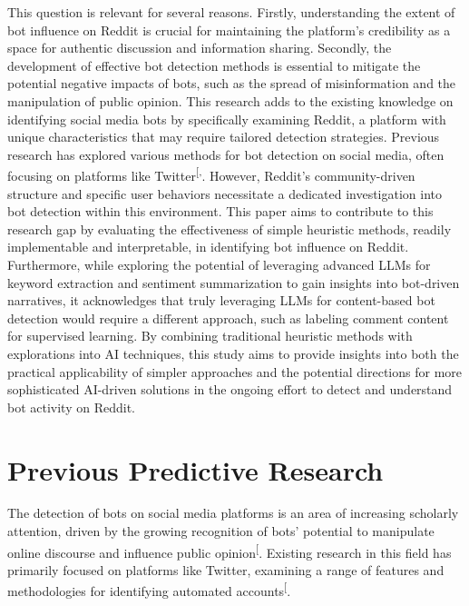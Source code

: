 \documentclass[
  12pt,
  letterpaper,
  DIV=11,
  numbers=noendperiod,
  abstract]{scrartcl}
\begin{document}
This question is relevant for several reasons. Firstly, understanding
the extent of bot influence on Reddit is crucial for maintaining the
platform's credibility as a space for authentic discussion and
information sharing. Secondly, the development of effective bot
detection methods is essential to mitigate the potential negative
impacts of bots, such as the spread of misinformation and the
manipulation of public opinion. This research adds to the existing
knowledge on identifying social media bots by specifically examining
Reddit, a platform with unique characteristics that may require tailored
detection strategies. Previous research has explored various methods for
bot detection on social media, often focusing on platforms like
Twitter\textsuperscript{{[},\citeproc{ref-multibotdetector}{4}{]}}.
However, Reddit's community-driven structure and specific user behaviors
necessitate a dedicated investigation into bot detection within this
environment. This paper aims to contribute to this research gap by
evaluating the effectiveness of simple heuristic methods, readily
implementable and interpretable, in identifying bot influence on Reddit.
Furthermore, while exploring the potential of leveraging advanced LLMs
for keyword extraction and sentiment summarization to gain insights into
bot-driven narratives, it acknowledges that truly leveraging LLMs for
content-based bot detection would require a different approach, such as
labeling comment content for supervised learning. By combining
traditional heuristic methods with explorations into AI techniques, this
study aims to provide insights into both the practical applicability of
simpler approaches and the potential directions for more sophisticated
AI-driven solutions in the ongoing effort to detect and understand bot
activity on Reddit.

\section{Previous Predictive
Research}\label{previous-predictive-research}

The detection of bots on social media platforms is an area of increasing
scholarly attention, driven by the growing recognition of bots'
potential to manipulate online discourse and influence public
opinion\textsuperscript{{[}\citeproc{ref-multibotdetector}{4}{]}}.
Existing research in this field has primarily focused on platforms like
Twitter, examining a range of features and methodologies for identifying
automated
accounts\textsuperscript{{[}\citeproc{ref-redditbotwatch}{3}{]}}.
\end{document}
